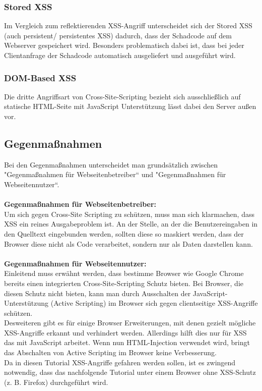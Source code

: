 \subsubsection*{Stored XSS}
Im Vergleich zum reflektierenden XSS-Angriff unterscheidet sich der Stored XSS (auch persistent/ persistentes XSS) dadurch, dass der Schadcode auf dem Webserver gespeichert wird. Besonders problematisch dabei ist, dass bei jeder Clientanfrage der Schadcode automatisch ausgeliefert und ausgeführt wird. \\ 
\subsubsection*{DOM-Based XSS}
Die dritte Angriffsart von Cross-Site-Scripting bezieht sich ausschließlich auf statische HTML-Seite mit JavaScript Unterstützung lässt dabei den Server außen vor. 
\subsection{Gegenmaßnahmen}

Bei den Gegenmaßnahmen unterscheidet man grundsätzlich zwischen "Gegenmaßnahmen für Webseitenbetreiber“ und "Gegenmaßnahmen für Webseitennutzer“.
\ \\
\ \\
\textbf{Gegenmaßnahmen für Webseitenbetreiber:}
\\
Um sich gegen Cross-Site Scripting zu schützen, muss man sich klarmachen, dass XSS ein reines Ausgabeproblem ist.
An der Stelle, an der die Benutzereingaben in den Quelltext eingebunden werden, sollten diese so maskiert werden, dass der Browser diese nicht als Code verarbeitet, sondern nur als Daten darstellen kann.
\\
\\
\textbf{Gegenmaßnahmen für Webseitennutzer:}
\\
Einleitend muss erwähnt werden, dass bestimme Browser wie Google Chrome bereits einen integrierten Cross-Site-Scripting Schutz bieten.
Bei Browser, die diesen Schutz nicht bieten, kann man durch Ausschalten der JavaScript-Unterstützung (Active Scripting) im Browser sich gegen clientseitige XSS-Angriffe schützen.\\
Desweiteren gibt es für einige Browser Erweiterungen, mit denen gezielt mögliche XSS-Angriffe erkannt und verhindert werden. 
Allerdings hilft dies nur für XSS das mit JavaScript arbeitet.
Wenn nun HTML-Injection verwendet wird, bringt das Abschalten von Active Scripting im Browser keine Verbesserung. 
\\
Da in diesen Tutorial XSS-Angriffe gefahren werden sollen, ist es zwingend notwendig, dass das nachfolgende Tutorial unter einem Browser ohne XSS-Schutz (z. B. Firefox) durchgeführt wird. 

